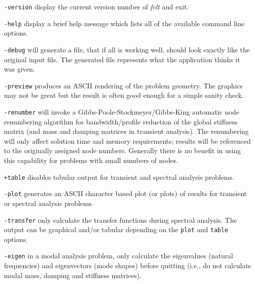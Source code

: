 \begin{dispitems}
\item [\tt -version]
        display the current version number of {\em felt} and exit.

\item [\tt -help]
        display a brief help message which lists all of the available command
        line options.

\item [\tt -debug]
	will generate a \felt{} file, that if all is working well, 
	should look exactly like the original input file.  The 
	generated file represents what the application thinks it was 
	given.

\item [\tt -preview]
        produces an ASCII rendering of the problem geometry.  The graphics
        may not be great but the result is often good enough for a simple
        sanity check.

\item [\tt -renumber]
        will invoke a Gibbs-Poole-Stockmeyer/Gibbs-King automatic node
        renumbering algorithm for bandwidth/profile reduction of the 
        global stiffness matrix (and mass and damping matrices in 
        transient analysis).  The renumbering will only affect solution
        time and memory requirements; results will be referenced to
        the originally assigned node numbers.  Generally there is no
        benefit in using this capability for problems with small numbers
        of nodes.

\item [\tt +table]
        disables tabular output for transient and spectral analysis
        problems. 

\item [\tt -plot]
        generates an ASCII character based plot (or plots) of results
        for transient or spectral analysis problems.

\item [\tt -transfer]
        only calculate the transfer functions during spectral analysis.  The
        output can be graphical and/or tabular depending on the {\tt plot}
        and {\tt table} options.

\item [\tt -eigen]
        in a modal analysis problem, only calculate the eigenvalues
        (natural frequencies) and eigenvectors (mode shapes) before quitting
        (i.e., do not calculate modal mass, damping and stiffness matrices).


\end{dispitems}
